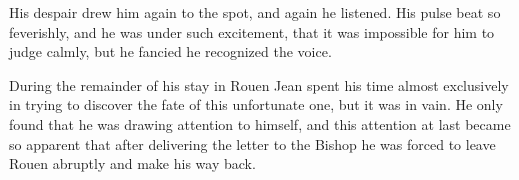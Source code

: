 His despair drew him again to the spot, and again he listened. His pulse
beat so feverishly, and he was under such excitement, that it was
impossible for him to judge calmly, but he fancied he recognized the
voice.

During the remainder of his stay in Rouen Jean spent his time almost
exclusively in trying to discover the fate of this unfortunate one, but
it was in vain. He only found that he was drawing attention to himself,
and this attention at last became so apparent that after delivering the
letter to the Bishop he was forced to leave Rouen abruptly and make his
way back.

\threeast

